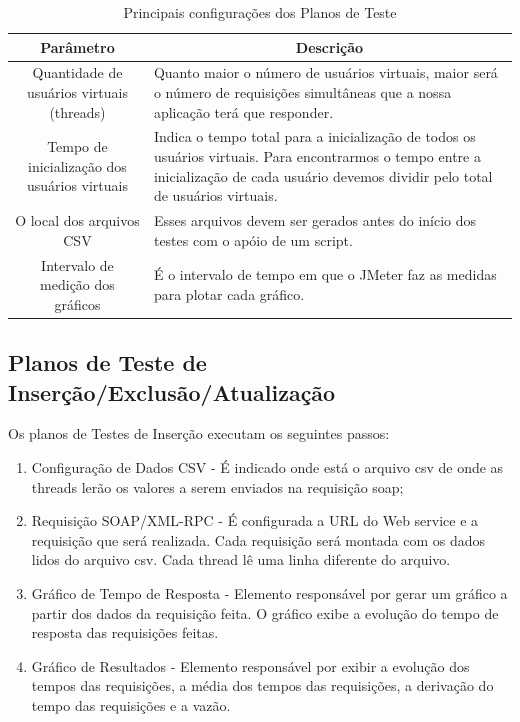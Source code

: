 \begin{table}
	\caption{Principais configurações dos Planos de Teste}
	\begin{center}
	\begin{tabularx}{\textwidth}{ | c | X | }
	\hline
		\textbf{Parâmetro} & \multicolumn{1}{c|}{\textbf{Descrição}} \\
	\hline
		Quantidade de usuários virtuais (threads) & Quanto maior o número de usuários virtuais, maior será o número de requisições simultâneas que a nossa aplicação terá que responder.\\
	\hline 
		Tempo de inicialização dos usuários virtuais & Indica o tempo total para a inicialização de todos os usuários virtuais. Para encontrarmos o tempo entre a inicialização de cada usuário devemos dividir pelo total de usuários virtuais.\\
	\hline
		O local dos arquivos CSV & Esses arquivos devem ser gerados antes do início dos testes com o apóio de um script.\\
	\hline
		Intervalo de medição dos gráficos & É o intervalo de tempo em que o JMeter faz as medidas para plotar cada gráfico.\\
	\hline
	\end {tabularx}
	\end{center}
	\label{tab:configplanoteste}
\end{table}

\subsection{Planos de Teste de Inserção/Exclusão/Atualização}

Os planos de Testes de Inserção executam os seguintes passos:

\begin{enumerate}
\item Configuração de Dados CSV - É indicado onde está o arquivo csv de onde as threads lerão os valores a serem enviados na requisição soap;
\item Requisição SOAP/XML-RPC - É configurada a URL do Web service e a requisição que será realizada. Cada requisição será montada com os dados lidos do arquivo csv. Cada thread lê uma linha diferente do arquivo.
\item Gráfico de Tempo de Resposta -  Elemento responsável por gerar um gráfico a partir dos dados da requisição feita. O gráfico exibe a  evolução do tempo de resposta das requisições feitas.
\item Gráfico de Resultados - Elemento responsável por exibir a evolução dos tempos das requisições, a média dos tempos das requisições, a derivação do tempo das requisições e a vazão.
\end{enumerate}

